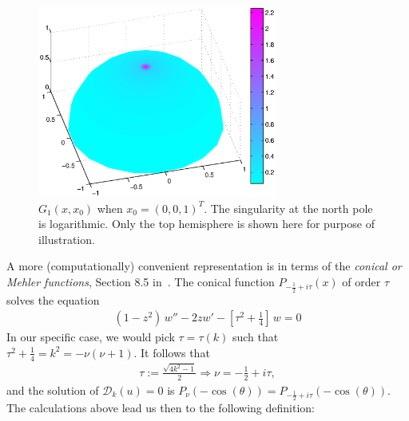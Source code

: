 \documentclass[final]{siamltex}
\begin{document}
\begin{figure}
  \centering
  \includegraphics[width=0.7\textwidth]{topG}
  \caption{\label{f:greensFun} $G_1(x,x_0)$ when $x_0=(0,0,1)^T$. The
  singularity at the north pole is logarithmic. Only the top hemisphere
  is shown here for purpose of illustration.}
\end{figure}
A more (computationally) convenient representation is in terms of the
{\it conical or Mehler functions}, Section 8.5 in~\cite{lebedev}. The
conical function $P_{-\frac{1}{2}+ i \tau}(x)$ of order $\tau$ solves
the equation
\begin{align*}
  (1-z^2)\,w'' -2zw' - \left[\tau^2+\frac{1}{4}\right]\,w = 0
\end{align*}
In our specific case, we would pick $\tau=\tau(k)$ such that
$\tau^2+\frac{1}{4}=k^2 = -\nu(\nu+1).$ It follows that 
\begin{align*}
 \tau:=\frac{\sqrt{4k^2-1}}{2} \Rightarrow  \nu= -\frac{1}{2}+i\tau, 
\end{align*}
and the solution of $\mathcal{D}_k(u)=0$ is $
  P_{\nu} (-\cos(\theta)) = P_{-\frac{1}{2} + i \tau} 
    (-\cos(\theta)).$
The calculations above lead us then to the following definition:
\end{document}
